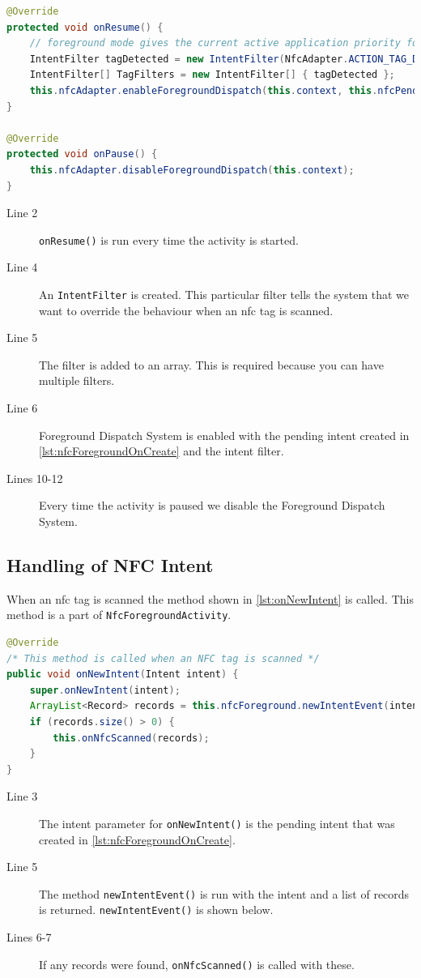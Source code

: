 \begin{lstlisting}[language=java, caption=Enable Foreground Dispatch System]
@Override
protected void onResume() {
	// foreground mode gives the current active application priority for reading scanned tags
	IntentFilter tagDetected = new IntentFilter(NfcAdapter.ACTION_TAG_DISCOVERED); 
	IntentFilter[] TagFilters = new IntentFilter[] { tagDetected };
	this.nfcAdapter.enableForegroundDispatch(this.context, this.nfcPendingIntent, TagFilters);
}

@Override
protected void onPause() {
    this.nfcAdapter.disableForegroundDispatch(this.context);
}
\end{lstlisting}
\begin{description}
\item[Line 2] \lstinline|onResume()| is run every time the activity is started.
\item[Line 4] An \lstinline|IntentFilter| is created. This particular filter tells the system that we want to override the behaviour when an \ac{nfc} tag is scanned.
\item[Line 5] The filter is added to an array. This is required because you can have multiple filters.
\item[Line 6] Foreground Dispatch System is enabled with the pending intent created in \autoref{lst:nfcForegroundOnCreate} and the intent filter.
\item[Lines 10-12] Every time the activity is paused we disable the Foreground Dispatch System.
\end{description}

\subsection*{Handling of NFC Intent}
When an \ac{nfc} tag is scanned the method shown in \autoref{lst:onNewIntent} is called. This method is a part of \lstinline|NfcForegroundActivity|.
\begin{lstlisting}[language=java, label=lst:onNewIntent, caption=\lstinline|onNewIntent()| method]
@Override
/* This method is called when an NFC tag is scanned */
public void onNewIntent(Intent intent) { 
    super.onNewIntent(intent);
    ArrayList<Record> records = this.nfcForeground.newIntentEvent(intent);
    if (records.size() > 0) {
        this.onNfcScanned(records);
    }
}  
\end{lstlisting}
\begin{description}
\item[Line 3] The intent parameter for \lstinline|onNewIntent()| is the pending intent that was created in \autoref{lst:nfcForegroundOnCreate}.
\item[Line 5] The method \lstinline|newIntentEvent()| is run with the intent and a list of records is returned. \lstinline|newIntentEvent()| is shown below.
\item[Lines 6-7] If any records were found, \lstinline|onNfcScanned()| is called with these.
\end{description}

